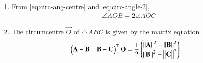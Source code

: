 \begin{enumerate}[label=\thesubsection.\arabic*.,ref=\thesubsection.\theenumi]
\begin{align}
	\label{eq:circ-angle-2}
  \end{align}
		\begin{proof}
			Since
\begin{align}
	\brak{\vec{C}-\vec{A}}^{\top} \brak{\vec{C}-\vec{B}} &= 
	\norm{\vec{C}}^2 - \vec{C}^{\top}\brak{\vec{A}+\vec{B}} + \vec{A}^{\top}\vec{B}
	\\
	&= 1 - \cos\brak{\theta-\theta_1} - \cos\brak{\theta-\theta_2} + \cos\brak{\theta_1-\theta_2}
	\\
	&= 2 \cos^2 \brak{\frac{\theta_1 - \theta_2}{2}}
	- 2 \cos \brak{\frac{\theta_1 - \theta_2}{2}}
	\cos \brak{\theta -\frac{\theta_1 + \theta_2}{2}}
	\\
	&= 4 \cos \brak{\frac{\theta_1 - \theta_2}{2}}
	\sin \brak{\frac{\theta - \theta_1}{2}}
	\sin \brak{\frac{\theta - \theta_2}{2}},
\end{align}
and 
\begin{align}
	\norm{\vec{C}-\vec{A}}^2 &= \norm{\vec{C}}^2+\norm{\vec{A}}^2 - 2\vec{C}^{\top}\vec{A},
	\\
&= 4 
	\sin^2 \brak{\frac{\theta - \theta_1}{2}}, 
	\\
	\norm{\vec{C}-\vec{B}}^2 &= \norm{\vec{C}}^2+\norm{\vec{B}}^2 - 2\vec{C}^{\top}\vec{B},
	\\
&= 4 
	\sin^2 \brak{\frac{\theta - \theta_2}{2}}, 
\end{align}
	\eqref{eq:circ-angle-1}
	can be expressed as
\begin{align}
	\frac{	  \cos \brak{\frac{\theta_1 - \theta_2}{2}}
	\sin \brak{\frac{\theta - \theta_1}{2}}
	\sin \brak{\frac{\theta - \theta_2}{2}}
	}
	{
	\sin \brak{\frac{\theta - \theta_1}{2}}
	\sin \brak{\frac{\theta - \theta_1}{2}} 
} 
\end{align}
yielding 
	\eqref{eq:circ-angle-2}
		\end{proof}
	\item From 
	\eqref{eq:circ-ang-centre}
	and 
	\eqref{eq:circ-angle-2},
	\label{prop:circ-ang-centre-arc}
\begin{align}
	\label{eq:circ-ang-centre-arc}
	\angle AOB = 2\angle AOC
\end{align}
\item The circumcentre $\vec{O}$ of $\triangle ABC$ is given by the matrix equation
\begin{align}
	\begin{pmatrix}\mathbf{A}-\mathbf{B} & \mathbf{B}-\mathbf{C}\end{pmatrix}^{\top} \mathbf{O} &= \frac{1}{2}\begin{pmatrix}\left\lVert\mathbf{A}\right\rVert^2 -\left\lVert\mathbf{B}\right\rVert^2 \\
	{\left\lVert\mathbf{B}\right\rVert^2 -\left\lVert\mathbf{C}\right\rVert^2}\end{pmatrix}
	\label{eq:circumcirc-eq}
\end{align}

\end{enumerate}
